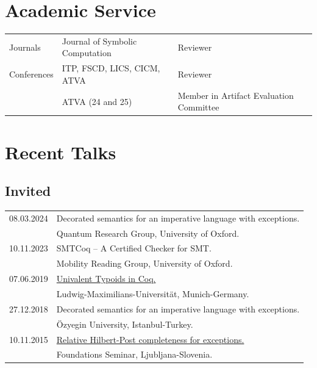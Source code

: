 \documentclass[a4paper,9pt]{article} %
\begin{document}
\section*{Academic Service}
\begin{longtable}{lll}
Journals & Journal of Symbolic Computation & Reviewer
\\[0.20cm]
Conferences & ITP, FSCD, LICS, CICM, ATVA & Reviewer \\
& ATVA (24 and 25) & Member in Artifact Evaluation Committee
\end{longtable}


\section*{Recent Talks}
{\vskip4mm}
\subsection*{Invited}

\begin{longtable}{ll}	

{\normalsize 08.03.2024} & {Decorated semantics for an imperative language with exceptions.} \\
& Quantum Research Group, University of Oxford.\\[0.25cm]
{\normalsize 10.11.2023} &{SMTCoq -- A Certified Checker for SMT.}\\
& Mobility Reading Group, University of Oxford.\\[0.25cm]
{\normalsize 07.06.2019}& \href{http://cj-xu.github.io/tim19/index.html}{Univalent Typoids in Coq.} \\
& Ludwig-Maximilians-Universität, Munich-Germany.\\[0.25cm]
{\normalsize 27.12.2018}& {Decorated semantics for an imperative language with exceptions.} \\
& Özyegin University, Istanbul-Turkey.\\[0.25cm]
{\normalsize10.11.2015} &\href{http://www.fmf.uni-lj.si/si/obvestila/35243/}{Relative Hilbert-Post completeness for exceptions.} \\
& Foundations Seminar, Ljubljana-Slovenia.
\end{longtable}
\end{document}
